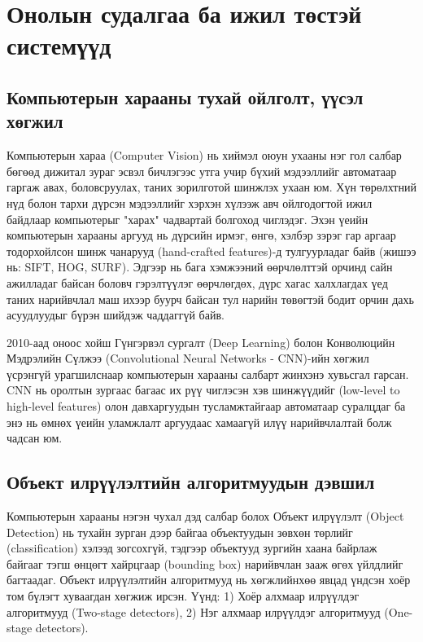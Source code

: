 \chapter{Онолын судалгаа ба ижил төстэй системүүд}

\section{Компьютерын харааны тухай ойлголт, үүсэл хөгжил}
Компьютерын хараа (Computer Vision) нь хиймэл оюун ухааны нэг гол салбар бөгөөд дижитал зураг эсвэл бичлэгээс утга учир бүхий мэдээллийг автоматаар гаргаж авах, боловсруулах, таних зорилготой шинжлэх ухаан юм. Хүн төрөлхтний нүд болон тархи дүрсэн мэдээллийг хэрхэн хүлээж авч ойлгодогтой ижил байдлаар компьютерыг "харах" чадвартай болгоход чиглэдэг. Эхэн үеийн компьютерын харааны аргууд нь дүрсийн ирмэг, өнгө, хэлбэр зэрэг гар аргаар тодорхойлсон шинж чанарууд (hand-crafted features)-д тулгуурладаг байв (жишээ нь: SIFT, HOG, SURF). Эдгээр нь бага хэмжээний өөрчлөлттэй орчинд сайн ажилладаг байсан боловч гэрэлтүүлэг өөрчлөгдөх, дүрс хагас халхлагдах үед таних нарийвчлал маш ихээр буурч байсан тул нарийн төвөгтэй бодит орчин дахь асуудлуудыг бүрэн шийдэж чаддаггүй байв. 

2010-аад оноос хойш Гүнгэрвэл сургалт (Deep Learning) болон Конволюцийн Мэдрэлийн Сүлжээ (Convolutional Neural Networks - CNN)-ийн хөгжил үсрэнгүй урагшилснаар компьютерын харааны салбарт жинхэнэ хувьсгал гарсан. CNN нь оролтын зургаас багаас их рүү чиглэсэн хэв шинжүүдийг (low-level to high-level features) олон давхаргуудын тусламжтайгаар автоматаар суралцдаг ба энэ нь өмнөх үеийн уламжлалт аргуудаас хамаагүй илүү нарийвчлалтай болж чадсан юм.

\section{Объект илрүүлэлтийн алгоритмуудын дэвшил}
Компьютерын харааны нэгэн чухал дэд салбар болох Объект илрүүлэлт (Object Detection) нь тухайн зурган дээр байгаа объектуудын зөвхөн төрлийг (classification) хэлээд зогсохгүй, тэдгээр объектууд зургийн хаана байрлаж байгааг тэгш өнцөгт хайрцгаар (bounding box) нарийвчлан зааж өгөх үйлдлийг багтаадаг. Объект илрүүлэлтийн алгоритмууд нь хөгжлийнхөө явцад үндсэн хоёр том бүлэгт хуваагдан хөгжиж ирсэн. Үүнд: 1) Хоёр алхмаар илрүүлдэг алгоритмууд (Two-stage detectors), 2) Нэг алхмаар илрүүлдэг алгоритмууд (One-stage detectors).

